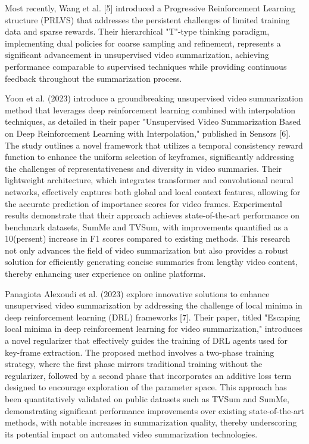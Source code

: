 \documentclass[conference]{IEEEtran}
\begin{document}
Most recently, Wang et al. [5] introduced a Progressive Reinforcement Learning structure (PRLVS) that addresses the persistent challenges of limited training data and sparse rewards. Their hierarchical "T"-type thinking paradigm, implementing dual policies for coarse sampling and refinement, represents a significant advancement in unsupervised video summarization, achieving performance comparable to supervised techniques while providing continuous feedback throughout the summarization process.

Yoon et al. (2023) introduce a groundbreaking unsupervised video summarization method that leverages deep reinforcement learning combined with interpolation techniques, as detailed in their paper "Unsupervised Video Summarization Based on Deep Reinforcement Learning with Interpolation," published in Sensors [6]. The study outlines a novel framework that utilizes a temporal consistency reward function to enhance the uniform selection of keyframes, significantly addressing the challenges of representativeness and diversity in video summaries. Their lightweight architecture, which integrates transformer and convolutional neural networks, effectively captures both global and local context features, allowing for the accurate prediction of importance scores for video frames. Experimental results demonstrate that their approach achieves state-of-the-art performance on benchmark datasets, SumMe and TVSum, with improvements quantified as a 10(persent) increase in F1 scores compared to existing methods. This research not only advances the field of video summarization but also provides a robust solution for efficiently generating concise summaries from lengthy video content, thereby enhancing user experience on online platforms.

Panagiota Alexoudi et al. (2023) explore innovative solutions to enhance unsupervised video summarization by addressing the challenge of local minima in deep reinforcement learning (DRL) frameworks [7]. Their paper, titled "Escaping local minima in deep reinforcement learning for video summarization," introduces a novel regularizer that effectively guides the training of DRL agents used for key-frame extraction. The proposed method involves a two-phase training strategy, where the first phase mirrors traditional training without the regularizer, followed by a second phase that incorporates an additive loss term designed to encourage exploration of the parameter space. This approach has been quantitatively validated on public datasets such as TVSum and SumMe, demonstrating significant performance improvements over existing state-of-the-art methods, with notable increases in summarization quality, thereby underscoring its potential impact on automated video summarization technologies.
\end{document}
